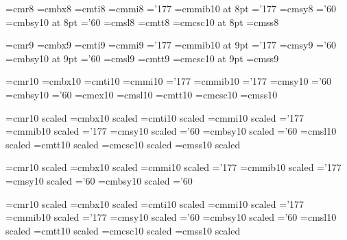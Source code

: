 \font\eightrm=cmr8
\font\eightbf=cmbx8
\font\eightit=cmti8
\font\eighti=cmmi8			\skewchar\eighti='177
\font\eightmib=cmmib10 at 8pt	\skewchar\eightmib='177
\font\eightsy=cmsy8			\skewchar\eightsy='60
\font\eightsyb=cmbsy10 at 8pt	\skewchar\eightsyb='60
\font\eightsl=cmsl8
\font\eighttt=cmtt8			\hyphenchar{}
\font\eightcsc=cmcsc10 at 8pt
\font\eightsf=cmss8

\font\ninerm=cmr9
\font\ninebf=cmbx9
\font\nineit=cmti9
\font\ninei=cmmi9			\skewchar\ninei='177
\font\ninemib=cmmib10 at 9pt	\skewchar\ninemib='177
\font\ninesy=cmsy9			\skewchar\ninesy='60
\font\ninesyb=cmbsy10 at 9pt	\skewchar\ninesyb='60
\font\ninesl=cmsl9
\font\ninett=cmtt9			\hyphenchar{}
\font\ninecsc=cmcsc10 at 9pt
\font\ninesf=cmss9

\font\tenrm=cmr10
\font\tenbf=cmbx10
\font\tenit=cmti10
\font\teni=cmmi10		\skewchar\teni='177
\font\tenmib=cmmib10	\skewchar\tenmib='177
\font\tensy=cmsy10		\skewchar\tensy='60
\font\tensyb=cmbsy10	\skewchar\tensyb='60
\font\tenex=cmex10
\font\tensl=cmsl10
\font\tentt=cmtt10		\hyphenchar{}
\font\tencsc=cmcsc10
\font\tensf=cmss10

\font\elevenrm=cmr10 scaled \magstephalf
\font\elevenbf=cmbx10 scaled \magstephalf
\font\elevenit=cmti10 scaled \magstephalf
\font\eleveni=cmmi10 scaled \magstephalf	\skewchar\eleveni='177
\font\elevenmib=cmmib10 scaled \magstephalf	\skewchar\elevenmib='177
\font\elevensy=cmsy10 scaled \magstephalf	\skewchar\elevensy='60
\font\elevensyb=cmbsy10 scaled \magstephalf	\skewchar\elevensyb='60
\font\elevensl=cmsl10 scaled \magstephalf
\font\eleventt=cmtt10 scaled \magstephalf	\hyphenchar{}
\font\elevencsc=cmcsc10 scaled \magstephalf
\font\elevensf=cmss10 scaled \magstephalf

\font\twelverm=cmr10 scaled 
\font\twelvebf=cmbx10 scaled 
\font\twelvei=cmmi10 scaled       \skewchar\twelvei='177
\font\twelvemib=cmmib10 scaled    \skewchar\twelvemib='177
\font\twelvesy=cmsy10 scaled      \skewchar\twelvesy='60
\font\twelvesyb=cmbsy10 scaled    \skewchar\twelvesyb='60

\font\fourteenrm=cmr10 scaled 
\font\fourteenbf=cmbx10 scaled 
\font\fourteenit=cmti10 scaled 
\font\fourteeni=cmmi10 scaled 		\skewchar\fourteeni='177
\font\fourteenmib=cmmib10 scaled 	\skewchar\fourteenmib='177
\font\fourteensy=cmsy10 scaled 	\skewchar\fourteensy='60
\font\fourteensyb=cmbsy10 scaled 	\skewchar\fourteensyb='60
\font\fourteensl=cmsl10 scaled 
\font\fourteentt=cmtt10 scaled 	\hyphenchar{}
\font\fourteencsc=cmcsc10 scaled 
\font\fourteensf=cmss10 scaled 

